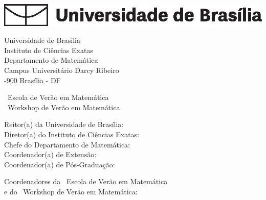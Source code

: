 	$\qquad$
	\thispagestyle{empty}
	\begin{flushleft}
		\includegraphics[scale=1]{obj/unb.eps}
		
		\vspace{1.5cm}
		
		\noindent Universidade de Bras\'{i}lia\\
		\noindent Instituto de Ci\^{e}ncias Exatas\\
		\noindent Departamento de Matem\'{a}tica\\
		\noindent Campus Universit\'{a}rio Darcy Ribeiro\\
		-900 Bras\'{i}lia - DF\\
		
		\vspace{1.15cm}
		
		\noindent \edverao\ Escola de Ver\~{a}o em Matem\'{a}tica\\
		\noindent \edworkshop\ Workshop de Ver\~{a}o em Matem\'{a}tica\\
		
		\vspace{1.15cm}
		
		\noindent Reitor(a) da Universidade de Bras\'{i}lia: \reitor \\
		\noindent Diretor(a) do Instituto de Ci\^{e}ncias Exatas: \dirIE \\
		\noindent Chefe do Departamento de Matem\'{a}tica: \chefMAT \\
		\noindent Coordenador(a) de Extens\~{a}o: \coordext \\
		\noindent Coordenador(a) de P\'{o}s-Gradua\c{c}\~{a}o: \coordpos \\
		
		\vspace{1.15cm}
		
		\noindent Coordenadores da \edverao\ Escola de Ver\~{a}o em Matem\'{a}tica \\e do \edworkshop\ Workshop de Ver\~{a}o em Matem\'{a}tica: \\
		\noindent \coordgeral\\
		\noindent  \coordgerali\\
		\noindent  \coordgeralii
		
		\vspace{1.15cm}
		

\end{flushleft}
